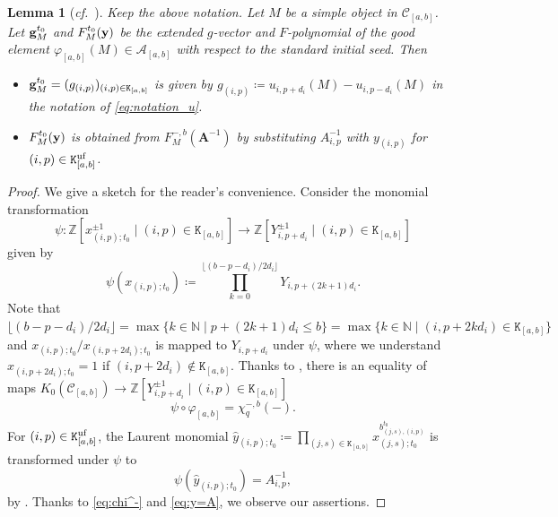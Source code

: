 \documentclass[12pt]{amsart}
\newtheorem{lemma}[theorem]{Lemma}
\theoremstyle{definition}
\theoremstyle{remark}
\numberwithin{equation}{section}
\newcommand{\confer}{\textit{cf.}\ }
\begin{document}
\begin{lemma}[{\confer\cite{HL16}}]\label{lem:gFab}
  Keep the above notation.   Let $M$ be a simple object in $\mathcal C_{[a,b]}$. Let ${\bf g}_M^{t_0}$ and $F_M^{t_0}({\bf y})$ be the extended $g$-vector and
    $F$-polynomial of the good element $\varphi_{[a,b]}(M)\in \mathcal A_{[a,b]}$ with respect to the standard initial seed. Then
    \begin{itemize}
\item[(i)] ${\bf g}_M^{t_0} = (g_{(i,p)})_{(i,p)\in \mathtt{K}_{[a,b]}}$ is given by $g_{(i,p)} \coloneqq u_{i,p+d_i}(M) - u_{i,p-d_i}(M)$ in the notation of \eqref{eq:notation_u}.
\item[(ii)] $F_M^{t_0}({\bf y})$ is obtained from $F^{-, b}_M(\mathbf{A}^{-1})$ by substituting $A_{i,p}^{-1}$ with ${y}_{(i,p)}$ for $(i,p)\in \mathtt{K}_{[a,b]}^{\rm uf}$.
\end{itemize}
\end{lemma}
\begin{proof}
    We give a sketch for the reader's convenience. 
    Consider the monomial transformation 
\[ \psi \colon \mathbb{Z}[x_{(i,p);t_0}^{\pm 1}\mid (i,p)\in \mathtt{K}_{[a,b]}] \to \mathbb{Z}[Y_{i,p+d_i}^{\pm 1} \mid (i,p) \in \mathtt{K}_{[a,b]}] \]
given by 
\[\psi(x_{(i,p);t_0}) \coloneqq \prod_{k=0}^{\lfloor (b-p-d_i)/2d_i\rfloor} Y_{i,p+(2k+1)d_i}.\]
Note that $\lfloor (b-p-d_i)/2d_i\rfloor=\max\{k\in \mathbb N\mid  p+(2k+1)d_i \leq b \}=\max\{k\in \mathbb N\mid (i,p+2kd_i)\in \mathtt K_{[a,b]} 
\}$ and $x_{(i,p);t_0}/x_{(i,p+2d_i);t_0}$ is mapped to $Y_{i,p+d_i}$ under $\psi$, where we understand $x_{(i,p+2d_i);t_0} = 1$ if $(i,p+2d_i) \not \in \mathtt{K}_{[a,b]}$. 
    Thanks to \cite[Theorem 5.1]{HL16}, there is an equality of maps ${K}_0(\mathcal{C}_{[a,b]}) \to \mathbb{Z}[Y_{i,p+d_i}^{\pm 1} \mid (i,p) \in \mathtt{K}_{[a,b]}]$
\begin{equation}\label{eq:chi^-}
\psi \circ \varphi_{[a,b]} = \chi^{-, b}_q(-).
\end{equation}   For $(i,p) \in \mathtt{K}_{[a,b]}^{\rm uf}$, the Laurent monomial $\hat{y}_{(i,p);t_0} \coloneqq 
\prod_{(j,s)\in \mathtt{K}_{[a,b]}} x_{(j,s); t_0}^{b_{(j,s),(i,p)}^{t_0}}$ is transformed under $\psi$ to
\begin{equation}\label{eq:y=A}
\psi(\hat{y}_{(i,p);t_0}) = A_{i,p}^{-1},
\end{equation}
by \cite[Lemma 4.15]{HL16}. Thanks to \eqref{eq:chi^-} and \eqref{eq:y=A}, we observe our assertions.
\end{proof}
\end{document}
